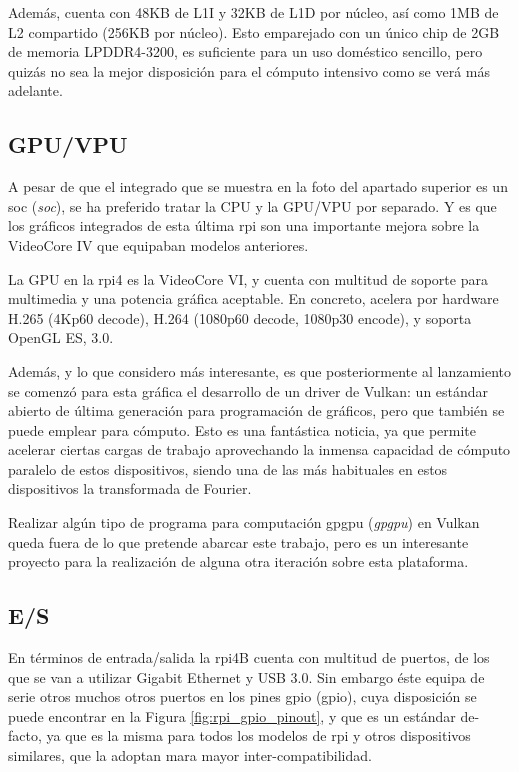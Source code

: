 Además, cuenta con 48KB de L1I y 32KB de L1D por núcleo, así como 1MB de L2 compartido (256KB por núcleo). Esto emparejado con un único chip de 2GB de memoria LPDDR4-3200, es suficiente para un uso doméstico sencillo, pero quizás no sea la mejor disposición para el cómputo intensivo como se verá más adelante.

\subsection{GPU/VPU}
\label{ssec:gpu_vpu}
A pesar de que el integrado que se muestra en la foto del apartado superior es un \acrshort{soc} (\textit{\acrlong{soc}}), se ha preferido tratar la CPU y la GPU/VPU por separado. Y es que los gráficos integrados de esta última \acrlong{rpi} son una importante mejora sobre la VideoCore IV que equipaban modelos anteriores.

La GPU en la \acrshort{rpi}4 es la VideoCore VI, y cuenta con multitud de soporte para multimedia y una potencia gráfica aceptable. En concreto, acelera por hardware H.265 (4Kp60 decode), H.264 (1080p60 decode, 1080p30 encode), y soporta OpenGL ES, 3.0.

Además, y lo que considero más interesante, es que posteriormente al lanzamiento se comenzó para esta gráfica el desarrollo de un driver de Vulkan: un estándar abierto de última generación para programación de gráficos, pero que también se puede emplear para cómputo. Esto es una fantástica noticia, ya que permite acelerar ciertas cargas de trabajo aprovechando la inmensa capacidad de cómputo paralelo de estos dispositivos, siendo una de las más habituales en estos dispositivos la transformada de Fourier.

Realizar algún tipo de programa para computación \acrshort{gpgpu} (\textit{\acrlong{gpgpu}}) en Vulkan queda fuera de lo que pretende abarcar este trabajo, pero es un interesante proyecto para la realización de alguna otra iteración sobre esta plataforma.

\subsection{E/S}
En términos de entrada/salida la \acrshort{rpi}4B cuenta con multitud de puertos, de los que se van a utilizar Gigabit Ethernet y USB 3.0. Sin embargo éste equipa de serie otros muchos otros puertos en los pines \acrshort{gpio} (\acrlong{gpio}), cuya disposición se puede encontrar en la Figura \ref{fig:rpi_gpio_pinout}, y que es un estándar de-facto, ya que es la misma para todos los modelos de \acrlong{rpi} y otros dispositivos similares, que la adoptan mara mayor inter-compatibilidad.

